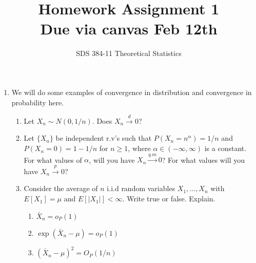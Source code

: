 \documentclass[11pt]{article}
\begin{document}
\title{{\bf Homework Assignment 1}\\Due via canvas Feb 12th}
\author{SDS 384-11 Theoretical Statistics}

\date{}

\maketitle{}
\begin{enumerate}%

\item We will do some examples of convergence in distribution and convergence in probability here.
\begin{enumerate}
	\item Let $X_n\sim N(0,1/n)$. Does $X_n\stackrel{d}{\rightarrow} 0$?
	\item  Let $\{X_n\}$ be independent r.v's such that $P(X_n=n^\alpha)=1/n$ and $P(X_n=0)=1-1/n$ for $n\geq 1$, where $\alpha\in (-\infty,\infty)$ is a constant. For what values of $\alpha$, will you have $X_n\stackrel{q.m}{\rightarrow} 0$? For what values will you have $X_n\stackrel{p}{\rightarrow} 0$?
	\item Consider the average of $n$ i.i.d random variables $X_1,\dots, X_n$ with $E[X_1]=\mu$ and $E[|X_1|]< \infty$. Write true or false. Explain.
	\begin{enumerate}
		\item $\bar{X}_n=o_P(1)$
		\item $\exp(\bar{X}_n-\mu) =o_P(1)$
		\item $(\bar{X}_n-\mu)^2 =O_P(1/n)$
	\end{enumerate}
		

\end{enumerate}
\end{enumerate}
\end{document}
